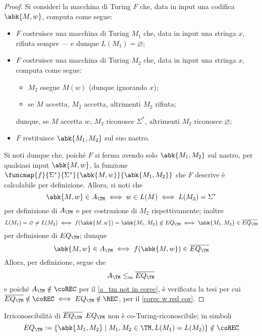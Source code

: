 \documentclass[a4paper, 12pt]{report}
\begin{document}
    \begin{proof}
        Si consideri la macchina di Turing $F$ che, data in input una codifica $\abk{M, w}$, computa come segue:

        \begin{itemize}
            \item $F$ costruisce una macchina di Turing $M_1$ che, data in input una stringa $x$, rifiuta sempre --- e dunque $L(M_1) = \varnothing$;
            \item $F$ costruisce una macchina di Turing $M_2$ che, data in input una stringa $x$, computa come segue:
                \begin{itemize}
                    \item $M_2$ esegue $M(w)$ (dunque ignorando $x$);
                    \item se $M$ accetta, $M_2$ accetta, altrimenti $M_2$ rifiuta;
                \end{itemize}
                dunque, se $M$ accetta $w$, $M_2$ riconosce $\Sigma^*$, altrimenti $M_2$ riconosce $\varnothing$;
            \item $F$ restituisce $\abk{M_1, M_2}$ sul suo nastro.
        \end{itemize}

        Si noti dunque che, poiché $F$ si ferma avendo solo $\abk{M_1, M_2}$ sul nastro, per qualsiasi input $\abk{M, w}$, la funzione $\funcmap{f}{\Sigma^*}{\Sigma^*}{\abk{M, w}}{\abk{M_1, M_2}}$ che $F$ descrive è calcolabile per definizione. Allora, si noti che $$\abk{M, w} \in A_\TM \iff w \in L(M) \iff L(M_2) = \Sigma ^*$$ per definizione di $A_\TM$ e per costruzione di $M_2$ rispettivamente; inoltre $$L(M_1) = \varnothing \neq L(M_2) \iff f(\abk{M, w}) = \abk{M_1, M_2} \notin EQ_\TM \iff \abk{M_1, M_2} \in \overline{EQ_\TM}$$ per definizione di $EQ_\TM$; dunque $$\abk{M, w} \in A_\TM \iff f(\abk{M, w}) \in \overline{EQ_\TM}$$ Allora, per definizione, segue che $$A_\TM \leq_\mathrm m \overline{EQ_\TM}$$ e poiché $A_\TM \notin \coREC$ per il \cref{a_tm not in corec}, è verificata la tesi per cui $\overline{EQ_\TM} \notin \coREC \iff EQ_\TM \notin \REC$, per il \cref{corec w red cor}.
    \end{proof}

    \begin{framedthm}{Irriconoscibilità di $\overline{EQ_\TM}$}
        $EQ_\TM$ non è co-Turing-riconoscibile; in simboli $$EQ_\TM := \{\abk{M_1, M_2} \mid M_1, M_2 \in \TM, L(M_1) = L(M_2)\} \notin \coREC$$
    \end{framedthm}
\end{document}
